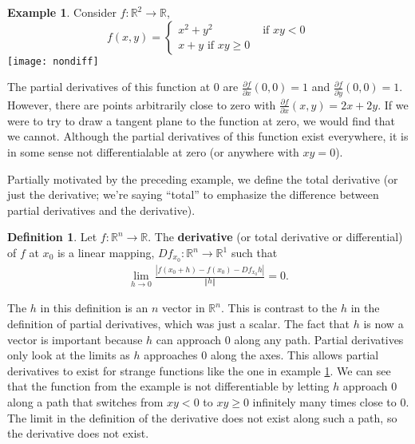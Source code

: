 \documentclass[12pt,reqno]{amsart}
\theoremstyle{definition}
\newtheorem{definition}{Definition}[section]
\newtheorem{example}{Example}[section]
\def\R{\mathbb{R}}
\newcommand{\norm}[1]{\left\Vert {#1} \right\Vert}
\renewcommand{\to}{{\rightarrow}}
\begin{document}
\begin{example}\label{ex:nondiff}
  Consider $f:\R^2 \to \R$, 
  \[ f(x,y) = \begin{cases} x^2+y^2 & \text{ if } xy < 0 \\
    x + y \text{ if } xy \geq 0 
  \end{cases}
  \]
  \texttt{[image: nondiff]}
  
  The partial derivatives of this function at $0$ are $\frac{\partial
    f}{\partial x}(0,0) = 1$ and $\frac{\partial f}{\partial y}(0,0) =
  1$. However, there are points arbitrarily close to zero with
  $\frac{\partial f}{\partial x}(x,y) = 2x + 2y$. If we were to try to
  draw a tangent plane to the function at zero, we would find that we
  cannot. Although the partial derivatives of this function exist
  everywhere, it is in some sense not differentialable at zero (or
  anywhere with $xy = 0$).
\end{example}
Partially motivated by the preceding example, we define the
total derivative (or just the derivative; we're saying ``total'' to
emphasize the difference between partial derivatives and the derivative).
\begin{definition}
  Let $f: \R^n \to \R$. The \textbf{derivative} (or total derivative
  or differential) of $f$ at $x_0$ is a linear mapping, $Df_{x_0}:
  \R^n \to \R^1$ such that
  \begin{align*}
    \lim_{h \to 0} \frac{\left|f(x_0 + h) - f(x_0) - Df_{x_0} h\right|} {\norm{h}}
    = 0.
  \end{align*}
\end{definition}
The $h$ in this definition is an $n$ vector in $\R^n$. This is
contrast to the $h$ in the definition of partial derivatives, which
was just a scalar. The fact that $h$ is now a vector is important
because $h$ can approach $0$ along any path. Partial derivatives only
look at the limits as $h$ approaches $0$ along the axes. This allows
partial derivatives to exist for strange functions like the one in
example \ref{ex:nondiff}. We can see that the function from the
example is not differentiable by letting $h$ approach $0$ along a path
that switches from $xy<0$ to $xy\geq 0$ infinitely many times close to
$0$. The limit in the definition of the derivative does not exist
along such a path, so the derivative does not exist. 
\end{document}
